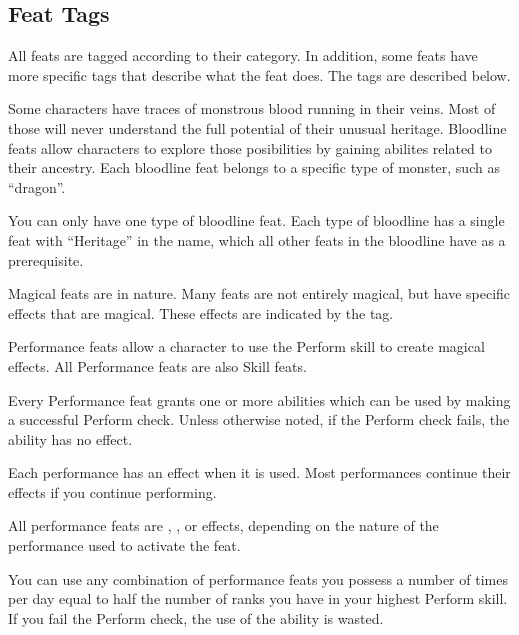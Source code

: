     \subsection{Feat Tags}

        All feats are tagged according to their category.
        In addition, some feats have more specific tags that describe what the feat does.
        The tags are described below.


        Some characters have traces of monstrous blood running in their veins.
        Most of those will never understand the full potential of their unusual heritage.
        Bloodline feats allow characters to explore those posibilities by gaining abilites related to their ancestry.
        Each bloodline feat belongs to a specific type of monster, such as ``dragon''.

        You can only have one type of bloodline feat.
        Each type of bloodline has a single feat with ``Heritage'' in the name, which all other feats in the bloodline have as a prerequisite.

        Magical feats are  in nature.
        Many feats are not entirely magical, but have specific effects that are magical.
        These effects are indicated by the \magical tag.

        \label{Performance Feats}
        Performance feats allow a character to use the Perform skill to create magical effects.
        All Performance feats are also Skill feats.

        Every Performance feat grants one or more abilities which can be used by making a successful Perform check.
        Unless otherwise noted, if the Perform check fails, the ability has no effect.

        Each performance has an effect when it is used.
        Most performances continue their effects if you continue performing.

        All performance feats are , , or  effects, depending on the nature of the performance used to activate the feat.

        You can use any combination of performance feats you possess a number of times per day equal to half the number of ranks you have in your highest Perform skill.
        If you fail the Perform check, the use of the ability is wasted.

